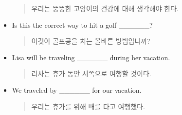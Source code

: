 \documentclass{article}
\begin{document}
\begin{addmargin}[1em]{1em}
\begin{itemize}
    \begin{quote}
    우리는 뚱뚱한 고양이의 건강에 대해 생각해야 한다.
    \end{quote}
    \item Is this the correct way to hit a golf \_\_\_\_\_\_?
    \begin{quote}
    이것이 골프공을 치는 올바른 방법입니까?
    \end{quote}
    \item Lisa will be traveling \_\_\_\_\_\_ during her vacation.
    \begin{quote}
    리사는 휴가 동안 서쪽으로 여행할 것이다.
    \end{quote}
    \item We traveled by \_\_\_\_\_\_ for our vacation.
    \begin{quote}
    우리는 휴가를 위해 배를 타고 여행했다.
    \end{quote}
\end{itemize}
\end{addmargin}
\end{document}
